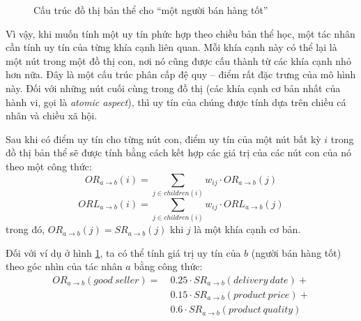 \begin{figure}[H]
  \centering
  \caption{Cấu trúc đồ thị bản thể cho ``một người bán hàng tốt''}
  \label{fig:good-seller-ontological-structure}
\end{figure}

Vì vậy, khi muốn tính một uy tín phức hợp theo chiều bản thể học, một tác nhân cần tính uy tín của từng khía cạnh liên quan.
Mỗi khía cạnh này có thể lại là một nút trong một đồ thị con, nơi nó cũng được cấu thành từ các khía cạnh nhỏ hơn nữa.
Đây là một cấu trúc phân cấp đệ quy -- điểm rất đặc trưng của mô hình này.
Đối với những nút cuối cùng trong đồ thị (các khía cạnh cơ bản nhất của hành vi, gọi là \textit{atomic aspect}),
thì uy tín của chúng được tính dựa trên chiều cá nhân và chiều xã hội.

Sau khi có điểm uy tín cho từng nút con, điểm uy tín của một nút bất kỳ $i$ trong đồ thị bản thể sẽ được tính bằng cách kết hợp
các giá trị của các nút con của nó theo một công thức:
\[OR_{a \rightarrow b}(i) = \sum_{j \in children(i)} w_{ij} \cdot OR_{a \rightarrow b}(j)\]
\[ORL_{a \rightarrow b}(i) = \sum_{j \in children(i)} w_{ij} \cdot ORL_{a \rightarrow b}(j)\]
trong đó, $OR_{a \rightarrow b}(j) = SR_{a \rightarrow b}(j)$ khi $j$ là một khía cạnh cơ bản.

Đối với ví dụ ở hình \ref{fig:good-seller-ontological-structure}, ta có thể tính giá trị uy tín của $b$ (người bán hàng tốt)
theo góc nhìn của tác nhân $a$ bằng công thức:
\begin{align*}
  OR_{a \rightarrow b}(good\ seller) =\  & 0.25 \cdot SR_{a \rightarrow b}(delivery\ date) + \\
                                         & 0.15 \cdot SR_{a \rightarrow b}(product\ price) + \\
                                         & 0.6 \cdot SR_{a \rightarrow b}(product\ quality)
\end{align*}

